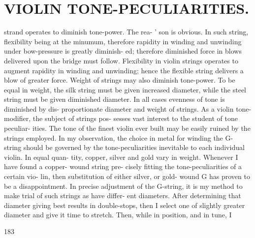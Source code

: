 \documentclass{article}
\begin{document}
\section*{VIOLIN TONE-PECULIARITIES.}
strand operates to diminish tone-power. The rea- ' son is obvious. In such string, flexibility being at the minumum, therefore rapidity in winding and unwinding under bow-pressure is greatly diminish- ed; therefore diminished force in blows delivered upon the bridge must follow. Flexibility in violin strings operates to augment rapidity in winding and unwinding; hence the flexible string delivers a blow of greater force. Weight of strings may also diminish tone-power. To be equal in weight, the silk string must be given increased diameter, while the steel string must be given diminished diameter. In all cases evenness of tone is diminished by dis- proportionate diameter and weight of strings. As a violin tone-modifier, the subject of strings pos- sesses vast interest to the student of tone peculiar- ities. The tone of the finest violin ever built may be easily ruined by the strings employed. In my observation, the choice in metal for winding the G- string should be governed by the tone-peculiarities inevitable to each individual violin. In equal quan- tity, copper, silver and gold vary in weight. Whenever I have found a copper- wound string pre- cisely fitting the tone-peculiarities of a certain vio- lin, then substitution of either silver, or gold- wound G has proven to be a disappointment. In precise adjustment of the G-string, it is my method to make trial of such strings as have differ- ent diameters. After determining that diameter giving best results in double-stops, then I select one of slightly greater diameter and give it time to stretch. Then, while in position, and in tune, I

183
\end{document}
